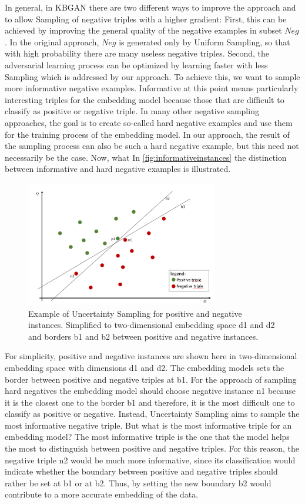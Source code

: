 In general, in \ac{KBGAN} there are two different ways to improve the approach and to allow Sampling of negative triples with a higher gradient:
First, this can be achieved by improving the general quality of the negative examples in subset $Neg$.
In the original approach, $Neg$ is generated only by Uniform Sampling, so that with high probability there are many useless negative triples.
Second, the adversarial learning process can be optimized by learning faster with less Sampling which is addressed by our approach.
To achieve this, we want to sample more informative negative examples.
Informative at this point means particularly interesting triples for the embedding model because those that are difficult to classify as positive or negative triple.
In many other negative sampling approaches, the goal is to create so-called hard negative examples and use them for the training process of the embedding model. 
In our approach, the result of the sampling process can also be such a hard negative example, but this need not necessarily be the case.
Now, what 
In \autoref{fig:informativeinstances} the distinction between informative and hard negative examples is illustrated.
\begin{figure}[t]
  \centering
    \includegraphics[width=0.75\textwidth]{figures/informative_instances.PNG}
  \caption{Example of Uncertainty Sampling for positive and negative instances. Simplified to two-dimensional embedding space d1 and d2 and borders b1 and b2 between positive and negative instances.}
  \label{fig:informativeinstances}
\end{figure}
For simplicity, positive and negative instances are shown here in two-dimensional embedding space with dimensions d1 and d2.
The embedding models sets the border between positive and negative triples at b1.
For the approach of sampling hard negatives the embedding model should choose negative instance n1 because it is the closest one to the border b1 and therefore, it is the most difficult one to classify as positive or negative.
Instead, Uncertainty Sampling aims to sample the most informative negative triple.
But what is the most informative triple for an embedding model?
The most informative triple is the one that the model helps the most to distinguish between positive and negative triples.
For this reason, the negative triple n2 would be much more informative, since its classification would indicate whether the boundary between positive and negative triples should rather be set at b1 or at b2.
Thus, by setting the new boundary b2 would contribute to a more accurate embedding of the data.

